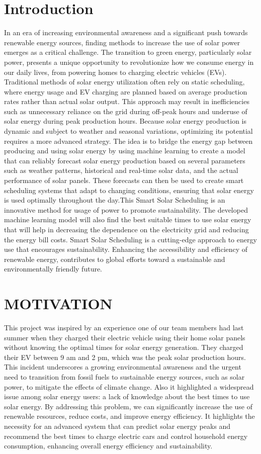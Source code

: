 \documentclass[conference]{IEEEtran}
\begin{document}
\section{Introduction}
In an era of increasing environmental awareness and a significant push towards renewable energy sources, finding methods to increase the use of solar power emerges as a critical challenge. The transition to green energy, particularly solar power, presents a unique opportunity to revolutionize how we consume energy in our daily lives, from powering homes to charging electric vehicles (EVs). Traditional methods of solar energy utilization often rely on static scheduling, where energy usage and EV charging are planned based on average production rates rather than actual solar output. This approach may result in inefficiencies such as unnecessary reliance on the grid during off-peak hours and underuse of solar energy during peak production hours. Because solar energy production is dynamic and subject to weather and seasonal variations, optimizing its potential requires a more advanced strategy. The idea is to bridge the energy gap between producing and using solar energy by using machine learning to create a model that can reliably forecast solar energy production based on several parameters such as weather patterns, historical and real-time solar data, and the actual performance of solar panels. These forecasts can then be used to create smart scheduling systems that adapt to changing conditions, ensuring that solar energy is used optimally throughout the day.This Smart Solar Scheduling  is an innovative method for usage of power to promote sustainability. The developed machine learning model will also find the best suitable times to use solar energy that will help in decreasing the dependence on the electricity grid and reducing the energy bill costs. Smart Solar Scheduling is a cutting-edge approach to energy use that encourages sustainability. Enhancing the accessibility and efficiency of renewable energy, contributes to global efforts toward a sustainable and environmentally friendly future.

\section{MOTIVATION}
This project was inspired by an experience one of our team members had last summer when they charged their electric vehicle using their home solar panels without knowing the optimal times for solar energy generation. They charged their EV between 9 am and 2 pm, which was the peak solar production hours. This incident underscores a growing environmental awareness and the urgent need to transition from fossil fuels to sustainable energy sources, such as solar power, to mitigate the effects of climate change. Also it highlighted a widespread issue among solar energy users: a lack of knowledge about the best times to use solar energy. By addressing this problem, we can significantly increase the use of renewable resources, reduce costs, and improve energy efficiency. It highlights the necessity for an advanced system that can predict solar energy peaks and recommend the best times to charge electric cars and control household energy consumption, enhancing overall energy efficiency and sustainability.
\end{document}
